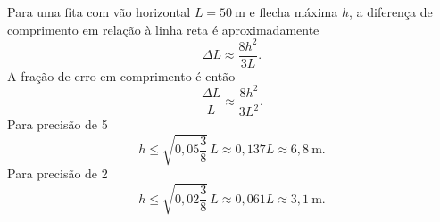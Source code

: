 Para uma fita com vão horizontal $L=50\ \mathrm{m}$ e flecha máxima $h$, a diferença de comprimento em relação à linha reta é aproximadamente
\[
\Delta L \approx \frac{8h^{2}}{3L}.
\]
A fração de erro em comprimento é então
\[
\frac{\Delta L}{L} \approx \frac{8h^{2}}{3L^{2}}.
\]
Para precisão de 5%
\[
h \le \sqrt{0{,}05\frac{3}{8}}\,L \approx 0{,}137 L \approx 6{,}8\ \mathrm{m}.
\]
Para precisão de 2%
\[
h \le \sqrt{0{,}02\frac{3}{8}}\,L \approx 0{,}061 L \approx 3{,}1\ \mathrm{m}.
\]